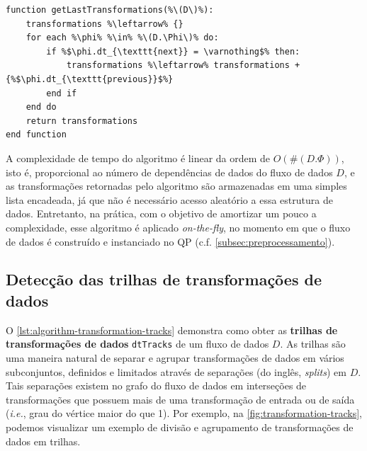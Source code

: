 \begin{minipage}[c]{0.95\textwidth}
\begin{lstlisting}[language=pseudocode,label={lst:algorithm-last-transformations},caption={[Detecção das últimas transformações de dados]Detecção das útimas transformações de dados em uma especificação de fluxo de dados.}]
function getLastTransformations(%\(D\)%):
    transformations %\leftarrow% {}
    for each %\phi% %\in% %\(D.\Phi\)% do:
        if %$\phi.dt_{\texttt{next}} = \varnothing$% then:
            transformations %\leftarrow% transformations + {%$\phi.dt_{\texttt{previous}}$%}
        end if
    end do
    return transformations
end function
\end{lstlisting}
\end{minipage}

A complexidade de tempo do algoritmo é linear da ordem de \( O(\#(D.\Phi)) \), isto é, proporcional ao número de dependências de dados do fluxo de dados \( D \), e as transformações retornadas pelo algoritmo são armazenadas em uma simples lista encadeada, já que não é necessário acesso aleatório a essa estrutura de dados. Entretanto, na prática, com o objetivo de amortizar um pouco a complexidade, esse algoritmo é aplicado \textit{on-the-fly}, no momento em que o fluxo de dados é construído e instanciado no QP (c.f. \autoref{subsec:preprocessamento}).

\subsection{Detecção das trilhas de transformações de dados}%
\label{subsec:deteccao-das-trilhas-de-transformacoes}

O \autoref{lst:algorithm-transformation-tracks} demonstra como obter as \textbf{trilhas de transformações de dados} \texttt{dtTracks} de um fluxo de dados \( D \). As trilhas são uma maneira natural de separar e agrupar transformações de dados em vários subconjuntos, definidos e limitados através de separações (do inglês, \textit{splits}) em \( D \). Tais separações existem no grafo do fluxo de dados em interseções de transformações que possuem mais de uma transformação de entrada ou de saída (\textit{i.e.}, grau do vértice maior do que 1). Por exemplo, na \autoref{fig:transformation-tracks}, podemos visualizar um exemplo de divisão e agrupamento de transformações de dados em trilhas.

